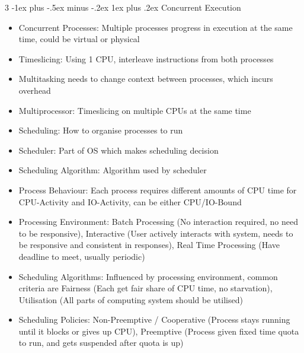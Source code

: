 \documentclass[10pt, landscape]{article}
\makeatletter
\renewcommand{\subsection}{\@startsection{subsection}{3}{0mm}%
                                {-1ex plus -.5ex minus -.2ex}%
                                {1ex plus .2ex}%
                                {\normalfont\small\bfseries}}%
\makeatother
\begin{document}
\begin{multicols*}{3}
\subsection{Concurrent Execution}
\begin{itemize}
    \item Concurrent Processes: Multiple processes progress in execution at the same time, could be virtual or physical
    \item Timeslicing: Using 1 CPU, interleave instructions from both processes
    \item Multitasking needs to change context between processes, which incurs overhead
    \item Multiprocessor: Timeslicing on multiple CPUs at the same time
    \item Scheduling: How to organise processes to run
    \item Scheduler: Part of OS which makes scheduling decision
    \item Scheduling Algorithm: Algorithm used by scheduler
    \item Process Behaviour: Each process requires different amounts of CPU time for CPU-Activity and IO-Activity, can be either CPU/IO-Bound
    \item Processing Environment: Batch Processing (No interaction required, no need to be responsive), Interactive (User actively interacts with system, needs to be responsive and consistent in responses), Real Time Processing (Have deadline to meet, usually periodic)
    \item Scheduling Algorithms: Influenced by processing environment, common criteria are Fairness (Each get fair share of CPU time, no starvation), Utilisation (All parts of computing system should be utilised)
    \item Scheduling Policies: Non-Preemptive / Cooperative (Process stays running until it blocks or gives up CPU), Preemptive (Process given fixed time quota to run, and gets suspended after quota is up)
\end{itemize}


\end{multicols*}
\end{document}
